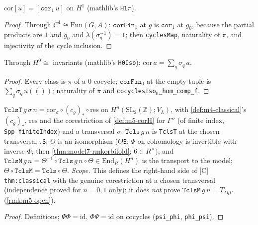 \begin{lemma}\label{lem:m5-corH-one}
  \leanok
  $\mathrm{cor}[u]=[\texttt{cor}_1\,u]$ on $H^1$ (mathlib's \texttt{H1}$\pi$).
\end{lemma}
\begin{proof}
  \leanok
  Through $C^1\cong\mathrm{Fun}(G,A)$: $\texttt{corFin}_1$ at $g$ is $\texttt{cor}_1$ at $g_0$, because the partial products are
  $1$ and $g_0$ and $\lambda(\sigma_q^{-1})=1$; then \texttt{cyclesMap}, naturality of $\pi$, and injectivity of the cycle inclusion.
\end{proof}

\begin{lemma}\label{lem:m5-corH-zero}
  \leanok
  Through $H^0\cong$ invariants (mathlib's \texttt{H0Iso}): $\mathrm{cor}\,a=\sum_q\sigma_q\,a$.
\end{lemma}
\begin{proof}
  \leanok
  Every class is $\pi$ of a $0$-cocycle; $\texttt{corFin}_0$ at the empty tuple is $\sum_q\sigma_q\,u(())$; naturality of $\pi$ and
  \texttt{cocyclesIso}$_0$\texttt{\_hom\_comp\_f}.
\end{proof}

\begin{definition}\label{def:m5-Tcls}
  \leanok
  $\texttt{TclsT}\,g\,\sigma\,n=\mathrm{cor}_\sigma\circ(c_g)_*\circ\mathrm{res}$ on $H^n(\mathrm{SL}_2(\mathbb Z);V_L)$, with
  \ref{def:m4-classical}'s $(c_g)_*$, $\mathrm{res}$ and the corestriction of \ref{def:m5-corH} for $\Gamma''$ (of finite index,
  \texttt{Spp\_finiteIndex}) and a transversal $\sigma$; $\texttt{Tcls}\,g\,n$ is \texttt{TclsT} at the chosen transversal $\tau$\texttt{S}. $\Theta$ is an isomorphism ($\Theta$\texttt{E}: $\Psi$ on cohomology is invertible with inverse
  $\Phi$, then \ref{thm:model7-rmkorbifold}; $6\in R^\times$), and $\texttt{TclsM}\,g\,n=\Theta^{-1}\circ\texttt{Tcls}\,g\,n\circ\Theta
  \in\mathrm{End}_R(H^n)$ is the transport to the model; $\Theta\circ\texttt{TclsM}=\texttt{Tcls}\circ\Theta$.
  \emph{Scope.} This defines the right-hand side of [C] \texttt{thm:classical} with the genuine corestriction at a chosen transversal (independence proved for $n=0,1$ only); it does
  \emph{not} prove $\texttt{TclsM}\,g\,n=T_{\Gamma g\Gamma}$ (\ref{rmk:m5-open}).
\end{definition}
\begin{proof}
  \leanok
  Definitions; $\Psi\Phi=\mathrm{id}$, $\Phi\Psi=\mathrm{id}$ on cocycles (\texttt{psi\_phi}, \texttt{phi\_psi}).
\end{proof}


